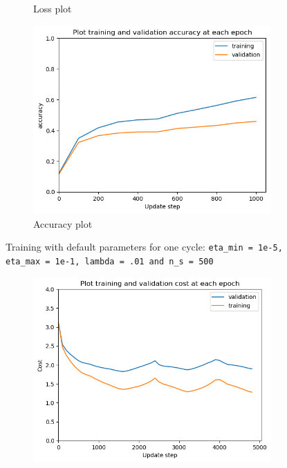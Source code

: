 \documentclass[12pt]{article}
\newenvironment{question}[2][Question]{\begin{trivlist}
\kern10pt
\item[\hskip \labelsep {\bfseries #1}\hskip \labelsep {\bfseries #2.}]}{\end{trivlist}}
\begin{document}
\begin{question}{2.ii}
\begin{figure}[!htb]
\begin{subfigure}[b]{0.32\textwidth}
        \caption{Loss plot}
    \end{subfigure}\hfill
    \begin{subfigure}[b]{0.32\textwidth}%
        \includegraphics[width=\linewidth]{f3_acc_plt.png}
        \caption{Accuracy plot}
    \end{subfigure}
    \caption{
        Training with default parameters for one cycle:
        \texttt{eta\_min = 1e-5, eta\_max = 1e-1,  lambda = .01 and n\_s = 500}
    }
    \label{fig:replicate_f3}
\end{figure}
\begin{figure}[!htb]
    \begin{subfigure}[b]{0.32\textwidth}
        \includegraphics[width=\linewidth]{f4_cost_plt.png}

\end{subfigure}
\end{figure}
\end{question}
\end{document}
